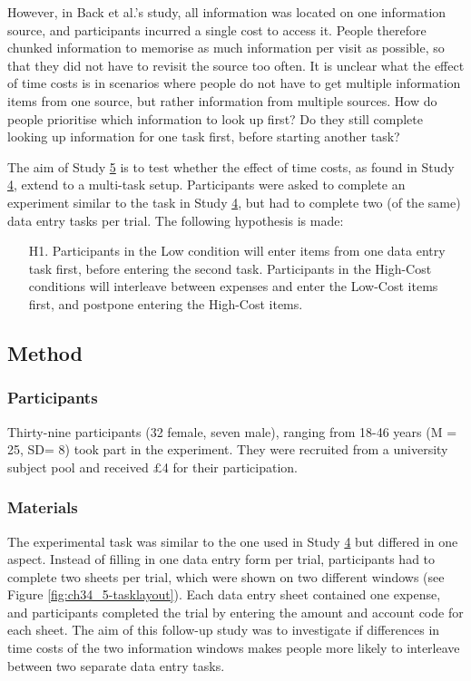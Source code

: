 However, in Back et al.'s study, all information was located on one information source, and participants incurred a single cost to access it. People therefore chunked information to memorise as much information per visit as possible, so that they did not have to revisit the source too often. It is unclear what the effect of time costs is in scenarios where people do not have to get multiple information items from one source, but rather information from multiple sources. How do people prioritise which information to look up first? Do they still complete looking up information for one task first, before starting another task?

The aim of Study \hyperref[st:Study5]{5} is to test whether the effect of time costs, as found in Study \hyperref[st:Study4]{4}, extend to a multi-task setup. Participants were asked to complete an experiment similar to the task in Study \hyperref[st:Study4]{4}, but had to complete two (of the same) data entry tasks per trial. The following hypothesis is made:

\begin{itemize}
\item [H1.]
Participants in the Low condition will enter items from one data entry task first, before entering the second task. Participants in the High-Cost conditions will interleave between expenses and enter the Low-Cost items first, and postpone entering the High-Cost items.
\end{itemize}

\subsection{Method}
\subsubsection{Participants}
Thirty-nine participants (32 female, seven male), ranging from 18-46 years (M = 25, SD= 8) took part in the experiment. They were recruited from a university subject pool and received $\pounds$4 for their participation.

\subsubsection{Materials}
The experimental task was similar to the one used in Study \hyperref[st:Study4]{4} but differed in one aspect. Instead of filling in one data entry form per trial, participants had to complete two sheets per trial, which were shown on two different windows (see Figure \ref{fig:ch34_5-tasklayout}). Each data entry sheet contained one expense, and participants completed the trial by entering the amount and account code for each sheet. The aim of this follow-up study was to investigate if differences in time costs of the two information windows makes people more likely to interleave between two separate data entry tasks.

